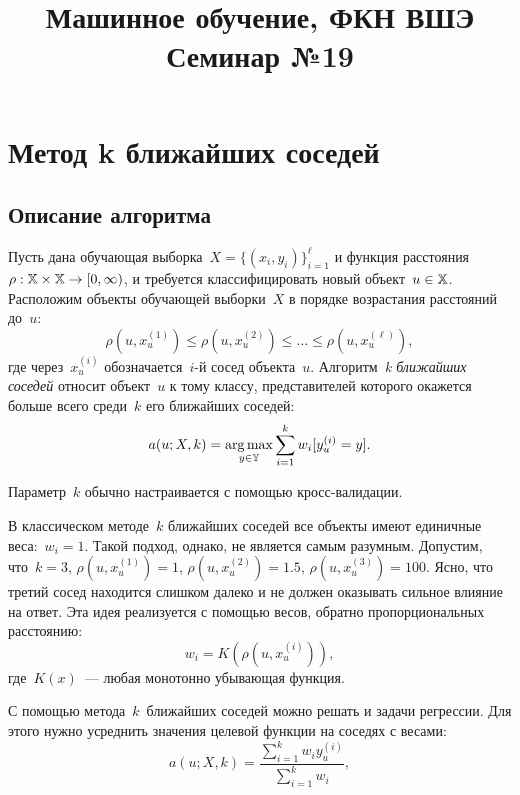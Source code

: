 \documentclass[12pt,fleqn]{article}
\begin{document}
\title{Машинное обучение, ФКН ВШЭ\\Семинар №19}
\author{}
\date{}
\maketitle


\section{Метод k ближайших соседей}
    \subsection{Описание алгоритма}
        Пусть дана обучающая выборка~$X = \{ (x_i, y_i)\}_{i = 1}^{\ell}$
        и функция расстояния~$\rho: \XX \times \XX \to [0, \infty)$,
        и требуется классифицировать новый объект~$u \in \mathbb{X}$.
        Расположим объекты обучающей выборки~$X$ в порядке возрастания
        расстояний до~$u$:
        \[
            \rho(u, x_u^{(1)})
            \leq
            \rho(u, x_u^{(2)})
            \leq
            \dots
            \leq
            \rho(u, x_u^{(\ell)}),
        \]
        где через~$x_u^{(i)}$ обозначается~$i$-й сосед объекта~$u$.
        Алгоритм~\emph{k ближайших соседей} относит объект~$u$ к тому классу,
        представителей которого окажется больше всего среди~$k$ его ближайших соседей:
        \[
            a(u; X, k) = \mathop{\rm arg\,max}\limits_{y \in \mathbb{Y}} \sum_{i = 1}^{k} w_i [y_u^{(i)} = y].
        \]

        Параметр~$k$ обычно настраивается с помощью кросс-валидации.

        В классическом методе~$k$ ближайших соседей все объекты имеют единичные веса:~$w_i = 1$.
        Такой подход, однако, не является самым разумным.
        Допустим, что~$k = 3$, $\rho(u, x_u^{(1)}) = 1$, $\rho(u, x_u^{(2)}) = 1.5$,
        $\rho(u, x_u^{(3)}) = 100$.
        Ясно, что третий сосед находится слишком далеко и не должен оказывать сильное влияние на ответ.
        Эта идея реализуется с помощью весов, обратно пропорциональных расстоянию:
        \[
            w_i
            =
            K \left(
                \rho(u, x_u^{(i)})
            \right),
        \]
        где~$K(x)$~--- любая монотонно убывающая функция.

        С помощью метода~$k$~ближайших соседей можно решать и задачи регрессии.
        Для этого нужно усреднить значения целевой функции на соседях с весами:
        \[
            a(u; X, k)
            =
            \frac{
                \sum_{i = 1}^{k}
                    w_i y_u^{(i)}
            }{
                \sum_{i = 1}^{k}
                    w_i
            },
        \]
\end{document}
